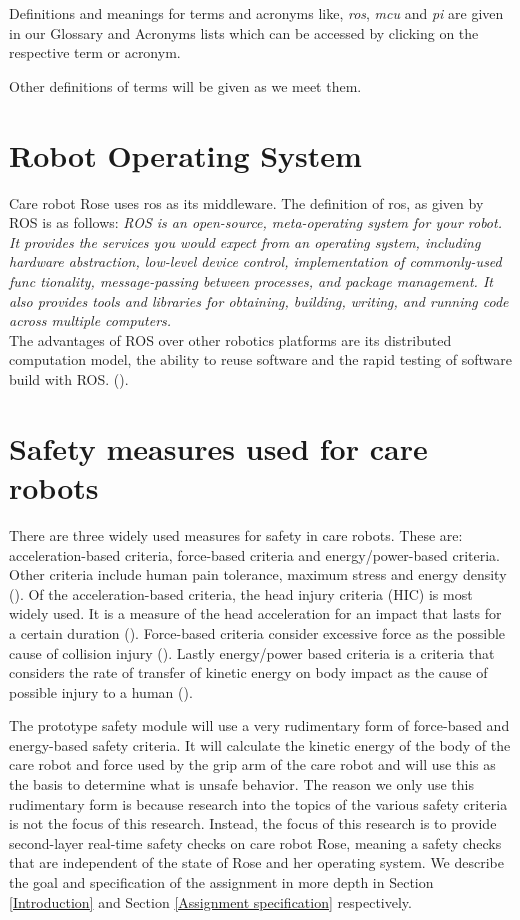 \documentclass[12pt]{scrreprt}
\begin{document}
\\\\
Definitions and meanings for terms and acronyms like, \textit{\acrshort{ros}}, \textit{\acrshort{mcu}} and \textit{\acrshort{pi}} are given in our Glossary and Acronyms lists which can be accessed by clicking on the respective term or acronym.
\par
Other definitions of terms will be given as we meet them.
    

\section{Robot Operating System}
\label{tROS}
Care robot Rose uses \acrfull{ros} as its middleware. The definition of \acrfull{ros}, as given by ROS \cite{ros_wiki_introducton} is as follows:
\textit{ROS is an open-source, meta-operating system for your robot. It provides the services you would expect from an operating system, including hardware abstraction, low-level device control, implementation of commonly-used func tionality, message-passing between processes, and package management. It also provides tools and libraries for obtaining, building, writing, and running code across multiple computers.}\\
 The advantages of ROS over other robotics platforms are its distributed computation model, the ability to reuse software and the rapid testing of software build with ROS. (\cite{agitr}).
 
 \section{Safety measures used for care robots}
 \label{Safety in care robots}
There are three widely used measures for safety in care robots. These are: acceleration-based criteria,  force-based criteria and energy/power-based criteria. Other criteria include human pain tolerance, maximum stress and energy density (\cite{tadele}). Of the acceleration-based criteria, the head injury criteria (HIC) is most widely used. It is a measure of the head acceleration for an impact that lasts for a certain duration (\cite{hic}). Force-based criteria consider excessive force as the possible cause of collision injury (\cite{force}). Lastly energy/power based criteria is a criteria that considers the rate of transfer of kinetic energy on body impact as the cause of possible injury to a human (\cite{crucial_milestone}).
\par
The prototype safety module will use a very rudimentary form of force-based and energy-based safety criteria. It will calculate the kinetic energy of the body of the care robot and force used by the grip arm of the care robot and will use this as the basis to determine what is unsafe behavior. The reason we only use this rudimentary form is because research into the topics of the various safety criteria is not the focus of this research. Instead, the focus of this research is to provide second-layer real-time safety checks on care robot Rose, meaning a safety checks that are independent of the state of Rose and her operating system. We describe the goal and specification of the assignment in more depth in Section \ref{Introduction} and Section \ref{Assignment specification} respectively.
 
\end{document}
